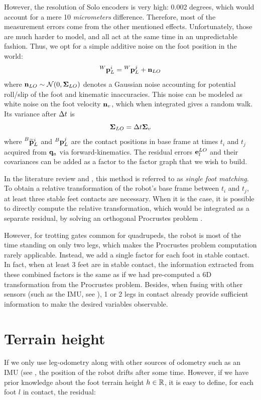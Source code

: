 However, the resolution of Solo encoders is very high: 0.002 degrees, which would account for a mere 10 \textit{micrometers} difference.
Therefore, most of the measurement errors come from the other mentioned effects. Unfortunately, those are much harder to model, and all act at the same time
in an unpredictable fashion. Thus, we opt for a simple additive noise on the foot position in the world:
%
\begin{equation}
    \prescript{W}{}{{\bf p}}_{L}^i = \prescript{W}{}{{\bf p}}_{L}^j + {\bf n}_{LO}
\end{equation}
%
where ${\bf n}_{LO} \sim \mathcal{N}({0},{{\bm \Sigma}_{LO}})$ denotes a Gaussian noise accounting for potential roll/slip of the foot and kinematic inaccuracies.
This noise can be modeled as white noise on the foot velocity ${\bf n}_v$, which when integrated gives a random walk.  
Its variance after $\Delta t$ is 
%
\begin{equation}
    {\bm \Sigma}_{LO} = \Delta t {\bm \Sigma}_v
\end{equation}
%
where $\prescript{B}{}{\widetilde{{\bf p}}}_{L}^i$ and $\prescript{B}{}{{\bf p}}_{L}^j$ are the contact positions in base frame at times $t_i$ and $t_j$ acquired from ${\bf q}_a$ via forward-kinematics. 
The residual errors ${\bf e}^{LO}_l$ and their covariances can be added as a factor to the factor graph that we wish to build.

In the literature review and , this method is referred to as \textit{single foot matching}. To obtain
a relative transformation of the robot's base frame between $t_i$ and $t_j$, at least three stable feet contacts are necessary. When it is the case, it is possible to directly compute the
relative transformation, which would be integrated as a separate residual, by solving an orthogonal Procrustes problem \cite{roston1991dead}.

However, for trotting gates common for quadrupeds, the robot is most of the time standing on only two legs, which makes the Procrustes problem computation rarely applicable. Instead, we add a single factor for each foot in stable contact. In fact, when at least 3 feet are in stable contact, the information extracted from these combined factors is the same as if we had pre-computed a 6D transformation from the Procrustes problem. Besides, when fusing with other sensors (such as the IMU,
see ), 1 or 2 legs in contact already provide sufficient information to make the desired variables observable.



\section{Terrain height}
If we only use leg-odometry along with other sources of odometry such as an IMU (see , the position of the robot drifts after some time. However, if we have prior knowledge about the foot terrain height $h \in \mathbb{R}$, it is easy to define, for each foot $l$ in contact, the residual:


